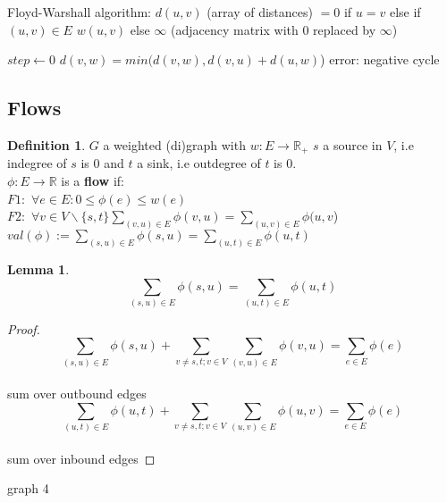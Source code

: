 \documentclass{article}
\newtheorem*{lemma}{Lemma}
\theoremstyle{definition}
\newtheorem*{definition}{Definition}
\theoremstyle{remark}
\begin{document}
\begin{algorithm}
    Floyd-Warshall algorithm: $d(u,v)$ (array of distances) $= 0 $ if $ u=v $ else if $ (u,v) \in E$ $w(u,v)$ else $\infty$ (adjacency matrix with 0 replaced by $\infty$)
    \begin{algorithmic}
    \State $step \gets 0$
                \State $d(v,w) = min(d(v,w), d(v,u)+d(u,w)$)
            \EndFor
                \State error: negative cycle
            \EndIf
        \EndFor
    \EndFor
    
    \end{algorithmic}
\end{algorithm}
\subsection*{Flows}
\begin{definition}
    $G$ a weighted (di)graph with $w: E \rightarrow \mathbb{R_+}$ $s$ a source in $V$, i.e indegree of $s$ is $0$ and $t$ a sink, i.e outdegree of $t $ is $0$.\\
    $\phi: E \rightarrow \mathbb{R}$ is a \textbf{flow} if:\\
    $F1:$ $\forall e \in E: 0 \leq \phi(e) \leq w(e)$\\
    $F2:$ $\forall v \in V\backslash \{s,t\} \sum_{(v,u)\in E} \phi(v,u)=\sum_{(u,v)\in E}\phi(u,v$)\\
    $val(\phi):=\sum_{(s,u) \in E}\phi(s,u)=\sum_{(u,t)\in E} \phi(u,t)$
\end{definition}
\begin{lemma}
    \begin{equation}
        \sum_{(s,u) \in E}\phi(s,u)=\sum_{(u,t)\in E} \phi(u,t)
    \end{equation}
\end{lemma}
\begin{proof}
    \begin{equation*}
        \sum_{(s,u) \in E}\phi(s,u) + \sum_{v\neq s,t; v \in V} \sum_{(v,u) \in E} \phi(v,u) = \sum_{e\in E} \phi(e) 
    \end{equation*}\\
    sum over outbound edges
    \begin{equation*}
    \sum_{(u,t)\in E} \phi(u,t) + \sum_{v\neq s,t; v \in V} \sum_{(u,v) \in E} \phi(u,v) = \sum_{e\in E}\phi(e)
    \end{equation*}\\
    sum over inbound edges
\end{proof}
graph 4
\end{document}
